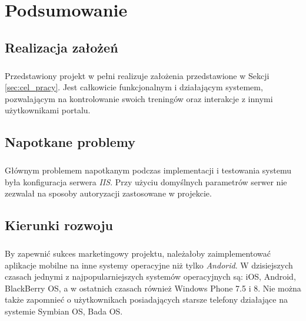 \chapter{Podsumowanie} %
\label{cha:podsumowanie}

\section{Realizacja założeń} %
\label{sec:realizacja_za_o_e_}
\paragraph{} %
\label{par:}

Przedstawiony projekt w pełni realizuje założenia przedstawione w Sekcji \ref{sec:cel_pracy}. Jest całkowicie funkcjonalnym i działającym systemem, pozwalającym na kontrolowanie swoich treningów oraz interakcje z innymi użytkownikami portalu.

\section{Napotkane problemy} %
\label{sec:napotkane_problemy}
\paragraph{} %
\label{par:}
Głównym problemem napotkanym podczas implementacji i testowania systemu była konfiguracja serwera \textit{IIS}. Przy użyciu domyślnych parametrów serwer nie zezwalał na sposoby autoryzacji zastosowane w projekcie.


\section{Kierunki rozwoju} %
\label{sec:kierunki_rozwoju}

\paragraph{} %
\label{par:}
By zapewnić sukces marketingowy projektu, należałoby zaimplementować aplikacje mobilne na inne systemy operacyjne niż tylko \textit{Andorid}. W dzisiejszych czasach jednymi z najpopularniejszych systemów operacyjnych są: iOS, Android, BlackBerry OS, a w ostatnich czasach również Windows Phone 7.5 i 8. Nie można także zapomnieć o użytkownikach posiadających starsze telefony działające na systemie Symbian OS, Bada OS.

